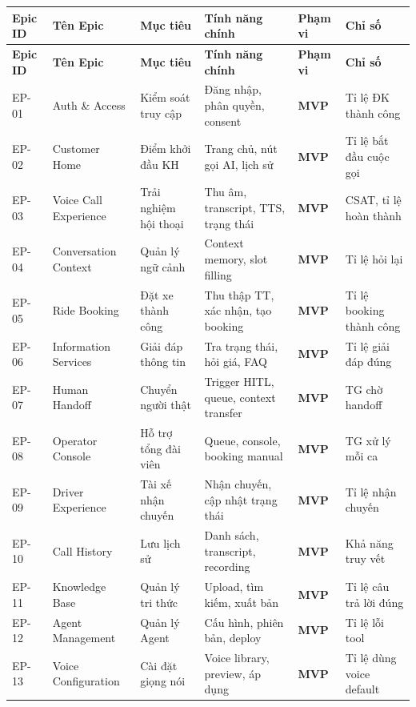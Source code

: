 \documentclass[12pt,a4paper]{article}
\newcommand{\mvptag}{\colorbox{AloLightBlue}{\small\textbf{MVP}}}
\begin{document}
\begin{longtable}{L{2cm} L{2.5cm} L{3cm} L{3.5cm} C{1.5cm} L{2.5cm}}
  \toprule
  \textbf{Epic ID}&\textbf{Tên Epic}&\textbf{Mục tiêu}&\textbf{Tính năng chính}&\textbf{Phạm vi}&\textbf{Chỉ số}\\
  \midrule\endfirsthead
  \toprule{}\textbf{Epic ID}&\textbf{Tên Epic}&\textbf{Mục tiêu}&\textbf{Tính năng chính}&\textbf{Phạm vi}&\textbf{Chỉ số}\\\midrule\endhead\bottomrule\endlastfoot
  EP-01 & Auth \& Access & Kiểm soát truy cập & Đăng nhập, phân quyền, consent & \mvptag & Tỉ lệ ĐK thành công \\
  EP-02 & Customer Home & Điểm khởi đầu KH & Trang chủ, nút gọi AI, lịch sử & \mvptag & Tỉ lệ bắt đầu cuộc gọi \\
  EP-03 & Voice Call Experience & Trải nghiệm hội thoại & Thu âm, transcript, TTS, trạng thái & \mvptag & CSAT, tỉ lệ hoàn thành \\
  EP-04 & Conversation Context & Quản lý ngữ cảnh & Context memory, slot filling & \mvptag & Tỉ lệ hỏi lại \\
  EP-05 & Ride Booking & Đặt xe thành công & Thu thập TT, xác nhận, tạo booking & \mvptag & Tỉ lệ booking thành công \\
  EP-06 & Information Services & Giải đáp thông tin & Tra trạng thái, hỏi giá, FAQ & \mvptag & Tỉ lệ giải đáp đúng \\
  EP-07 & Human Handoff & Chuyển người thật & Trigger HITL, queue, context transfer & \mvptag & TG chờ handoff \\
  EP-08 & Operator Console & Hỗ trợ tổng đài viên & Queue, console, booking manual & \mvptag & TG xử lý mỗi ca \\
  EP-09 & Driver Experience & Tài xế nhận chuyến & Nhận chuyến, cập nhật trạng thái & \mvptag & Tỉ lệ nhận chuyến \\
  EP-10 & Call History & Lưu lịch sử & Danh sách, transcript, recording & \mvptag & Khả năng truy vết \\
  EP-11 & Knowledge Base & Quản lý tri thức & Upload, tìm kiếm, xuất bản & \mvptag & Tỉ lệ câu trả lời đúng \\
  EP-12 & Agent Management & Quản lý Agent & Cấu hình, phiên bản, deploy & \mvptag & Tỉ lệ lỗi tool \\
  EP-13 & Voice Configuration & Cài đặt giọng nói & Voice library, preview, áp dụng & \mvptag & Tỉ lệ dùng voice default \\

\end{longtable}
\end{document}
